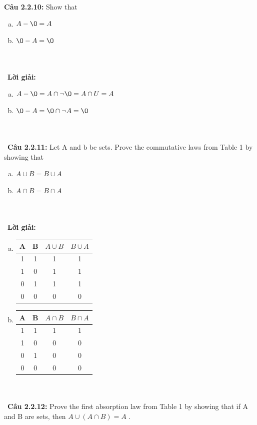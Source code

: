 \documentclass[a4paper]{article}
\begin{document}
\textbf{Câu 2.2.10: } Show that
\begin{enumerate}[a)]
\item $A - \O = A$
\item $\O - A = \O$
\end{enumerate} \\\ \\\
\textbf{Lời giải:} \begin{enumerate}[a)]
\item $A - \O = A \cap \lnot \O = A \cap U =A$
\item $\O - A = \O \cap \lnot A = \O$
\end{enumerate} \\\ \\\
\textbf{Câu 2.2.11: } Let A and b be sets. Prove the commutative laws from Table 1 by showing that 
\begin{enumerate}[a)]
\item $A \cup B = B \cup A$
\item $A \cap B = B \cap A$
\end{enumerate} \\\ \\\
\textbf{Lời giải:} \begin{enumerate}[a)]
\item \begin{tabular}{|c|c|c|c|}
\hline 
A & B & $A \cup B$ & $B \cup A$ \\ 
\hline 
1 & 1 & 1 & 1 \\ 
\hline 
1 & 0 & 1 & 1 \\ 
\hline 
0 & 1 & 1 & 1 \\ 
\hline 
0 & 0 & 0 & 0 \\ 
\hline 
\end{tabular} 
\item \begin{tabular}{|c|c|c|c|}
\hline 
A & B & $A \cap B$ & $B \cap A$ \\ 
\hline 
1 & 1 & 1 & 1 \\ 
\hline 
1 & 0 & 0 & 0 \\ 
\hline 
0 & 1 & 0 & 0 \\ 
\hline 
0 & 0 & 0 & 0 \\ 
\hline 
\end{tabular} 
\end{enumerate} \\\ \\\
\textbf{Câu 2.2.12: } Prove the first absorption law from Table 1 by showing that if A and B are sets, then $A \cup (A \cap B)=A$ .
 \\\ \\\
\end{document}
